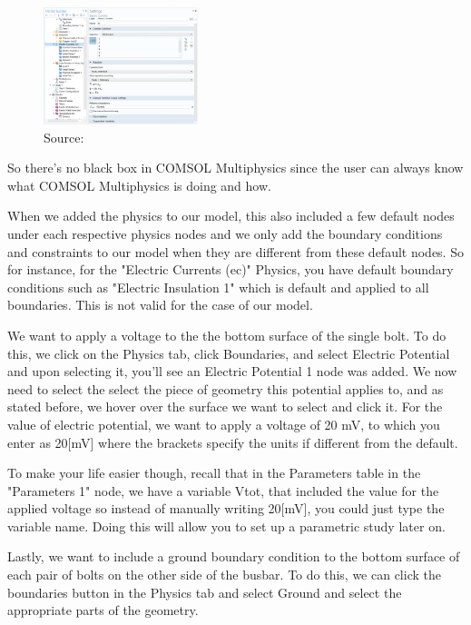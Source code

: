 \begin{figure}[ht!]
  \centering
  \includegraphics[width=0.4\textwidth]{Chapters/Figures/Chapter 3 Figures/Electrical Currents Physics Equation.png}
  \caption{Source: \cite{}}
  \label{}
\end{figure}

So there's no black box in COMSOL Multiphysics since the user can always know what COMSOL Multiphysics is doing and how.

When we added the physics to our model, this also included a few default nodes under each respective physics nodes and we only add the boundary conditions and constraints to our model when they are different from these default nodes. So for instance, for the "Electric Currents (ec)" Physics, you have default boundary conditions such as "Electric Insulation 1" which is default and applied to all boundaries. This is not valid for the case of our model.

We want to apply a voltage to the the bottom surface of the single bolt. To do this, we click on the Physics tab, click Boundaries, and select Electric Potential and upon selecting it, you'll see an Electric Potential 1 node was added. We now need to select the select the piece of geometry this potential applies to, and as stated before, we hover over the surface we want to select and click it. For the value of electric potential, we want to apply a voltage of 20 mV, to which you enter as 20[mV] where the brackets specify the units if different from the default.

To make your life easier though, recall that in the Parameters table in the "Parameters 1" node, we have a variable Vtot, that included the value for the applied voltage so instead of manually writing 20[mV], you could just type the variable name. Doing this will allow you to set up a parametric study later on.

Lastly, we want to include a ground boundary condition to the bottom surface of each pair of bolts on the other side of the busbar. To do this, we can click the boundaries button in the Physics tab and select Ground and select the appropriate parts of the geometry.

